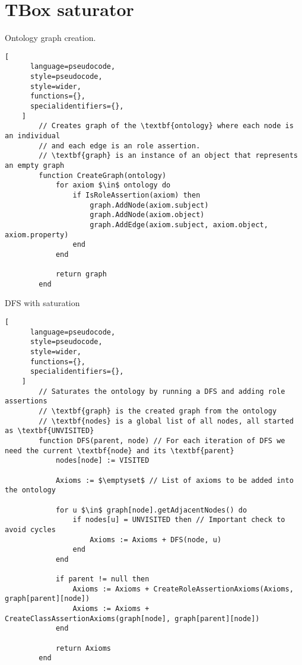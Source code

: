 
\chapter{TBox saturator}

\begin{programruledcaption}{Ontology graph creation.\label{prog:create-graph}}
    \begin{lstlisting}[
      language=pseudocode,
      style=pseudocode,
      style=wider,
      functions={},
      specialidentifiers={},
    ]
        // Creates graph of the \textbf{ontology} where each node is an individual 
        // and each edge is an role assertion.
        // \textbf{graph} is an instance of an object that represents an empty graph
        function CreateGraph(ontology)
            for axiom $\in$ ontology do
                if IsRoleAssertion(axiom) then
                    graph.AddNode(axiom.subject)
                    graph.AddNode(axiom.object)
                    graph.AddEdge(axiom.subject, axiom.object, axiom.property) 
                end
            end 

            return graph
        end
    \end{lstlisting}
\end{programruledcaption}

\begin{programruledcaption}{DFS with saturation\label{prog:dfs}}
    \begin{lstlisting}[
      language=pseudocode,
      style=pseudocode,
      style=wider,
      functions={},
      specialidentifiers={},
    ]
        // Saturates the ontology by running a DFS and adding role assertions
        // \textbf{graph} is the created graph from the ontology
        // \textbf{nodes} is a global list of all nodes, all started as \textbf{UNVISITED}
        function DFS(parent, node) // For each iteration of DFS we need the current \textbf{node} and its \textbf{parent}
            nodes[node] := VISITED     

            Axioms := $\emptyset$ // List of axioms to be added into the ontology

            for u $\in$ graph[node].getAdjacentNodes() do
                if nodes[u] = UNVISITED then // Important check to avoid cycles
                    Axioms := Axioms + DFS(node, u)
                end
            end

            if parent != null then
                Axioms := Axioms + CreateRoleAssertionAxioms(Axioms, graph[parent][node])
                Axioms := Axioms + CreateClassAssertionAxioms(graph[node], graph[parent][node])
            end

            return Axioms
        end
    \end{lstlisting}
\end{programruledcaption}

